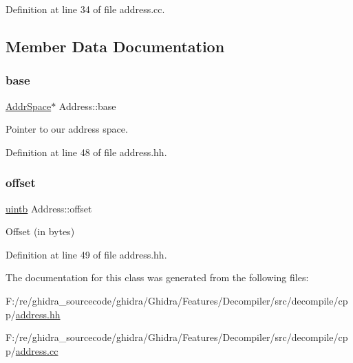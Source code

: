 Definition at line 34 of file address.\+cc.



\subsection{Member Data Documentation}
\mbox{\label{class_address_ac08d67074731b83664127bb0cc190bfe}} 
\subsubsection{\texorpdfstring{base}{base}}
{\footnotesize\ttfamily \mbox{\hyperlink{class_addr_space}{Addr\+Space}}$\ast$ Address\+::base\hspace{0.3cm}{\ttfamily [protected]}}



Pointer to our address space. 



Definition at line 48 of file address.\+hh.

\mbox{\label{class_address_adbb9f0a40c81e28e83eca5a9de2959a8}} 
\subsubsection{\texorpdfstring{offset}{offset}}
{\footnotesize\ttfamily \mbox{\hyperlink{types_8h_a2db313c5d32a12b01d26ac9b3bca178f}{uintb}} Address\+::offset\hspace{0.3cm}{\ttfamily [protected]}}



Offset (in bytes) 



Definition at line 49 of file address.\+hh.



The documentation for this class was generated from the following files\+:\begin{DoxyCompactItemize}
\item 
F\+:/re/ghidra\+\_\+sourcecode/ghidra/\+Ghidra/\+Features/\+Decompiler/src/decompile/cpp/\mbox{\hyperlink{address_8hh}{address.\+hh}}\item 
F\+:/re/ghidra\+\_\+sourcecode/ghidra/\+Ghidra/\+Features/\+Decompiler/src/decompile/cpp/\mbox{\hyperlink{address_8cc}{address.\+cc}}\end{DoxyCompactItemize}
